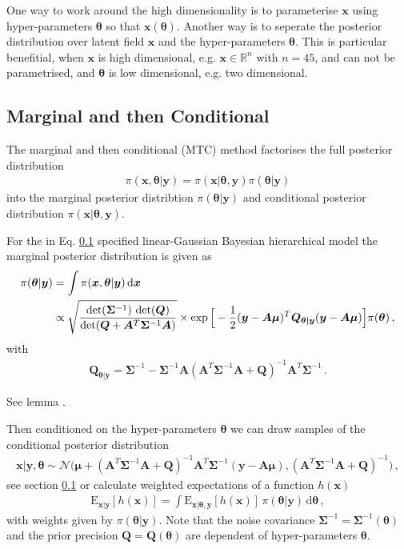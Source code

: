 One way to work around the high dimensionality is to parameterise $\bm{x}$ using hyper-parameters $\bm{\theta}$ so that $\bm{x}(\bm{\theta})$. 
Another way is to seperate the posterior distribution over latent field $\bm{x}$ and the hyper-parameters $\bm{\theta}$.
This is particular benefitial, when $\bm{x}$ is high dimensional, e.g. $\bm{x} \in \mathbb{R}^n$ with $n = 45$, and can not be parametrised, and $\bm{\theta}$ is low dimensional, e.g. two dimensional.


\subsection{Marginal and then Conditional}
The marginal and then conditional (MTC) method factorises the full posterior distribution 
\begin{align}
	\pi(\bm{x}, \bm{\theta}|\bm{y}) = \pi(\bm{x}| \bm{\theta}, \bm{y}) \pi(\bm{\theta}|\bm{y})
\end{align}
into the marginal posterior distribtion $ \pi(\bm{\theta}|\bm{y})$ and conditional posterior distribution $\pi(\bm{x}| \bm{\theta}, \bm{y})$.


For the in Eq. \ref{} specified linear-Gaussian Bayesian hierarchical model the marginal posterior distribution is given as
\begin{align}
	\pi(\bm{\theta} | \bm{y}) &= \int \pi(\bm{x}, \bm{\theta} | \bm{y}) \mathop{}\!\mathrm{d} \bm{x} \\ 
	\label{eq:condHyper}
	&\propto \sqrt{ \frac{ \det( \bm{\Sigma}^{-1} ) \,  \det( \bm{Q}) }{\det( \bm{Q} + \bm{A}^T \bm{\Sigma}^{-1} \bm{A} ) } } \times \exp \Big[ - \frac{1}{2}(\bm{y} -\bm{A \mu})^T \bm{Q}_{\bm{\theta|y}} (\bm{y} -\bm{A \mu}) \Big] \pi(\bm{\theta}) \, ,
\end{align}
with
\begin{align}
	\bm{Q}_{\bm{\theta|y}} = \bm{\Sigma}^{-1} - \bm{\Sigma}^{-1} \bm{A} (\bm{A}^T \bm{\Sigma}^{-1} \bm{A} + \bm{Q} )^{-1} \bm{A}^T \bm{\Sigma}^{-1} \,  .
\end{align}

See lemma \cite{}.

Then conditioned on the hyper-parameters $\bm{\theta}$ we can draw samples of the conditional posterior distribution
\begin{align}
	\bm{x}| \bm{y} , \bm{\theta} \sim \mathcal{N}\big( \bm{\mu} + (\bm{A}^T \bm{\Sigma}^{-1} \bm{A} + \bm{Q} )^{-1} \bm{A}^T \bm{\Sigma}^{-1} (\bm{y} - \bm{A} \bm{\mu}), (\bm{A}^T \bm{\Sigma}^{-1} \bm{A} + \bm{Q} )^{-1} \big) \, ,
\end{align}
see section \ref{} or calculate weighted expectations of a function $h(\bm{x})$
\begin{align}
	\label{eq:lte}
	\text{E}_{\bm{x}|\bm{y}} [h(\bm{x})] = \int   \text{E}_{\bm{x}|\bm{\theta},\bm{y}} [h(\bm{x})] \, \pi(\bm{\theta} | \bm{y} )  \, \text{d} \bm{\theta} \,  ,
\end{align}
with weights given by $\pi(\bm{\theta} | \bm{y} )$.
\cite{}
Note that the noise covariance $\bm{\Sigma}^{-1} = \bm{\Sigma}^{-1}( \bm{\theta}) $ and the prior precision $\bm{Q} = \bm{Q}( \bm{\theta})$ are dependent of hyper-parameters $\bm{\theta}$.


